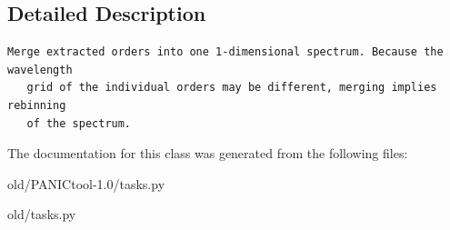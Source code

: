 \subsection{Detailed Description}


\footnotesize\begin{verbatim}Merge extracted orders into one 1-dimensional spectrum. Because the wavelength
   grid of the individual orders may be different, merging implies rebinning
   of the spectrum.
\end{verbatim}
\normalsize
 



The documentation for this class was generated from the following files:\begin{CompactItemize}
\item 
old/PANICtool-1.0/tasks.py\item 
old/tasks.py\end{CompactItemize}
